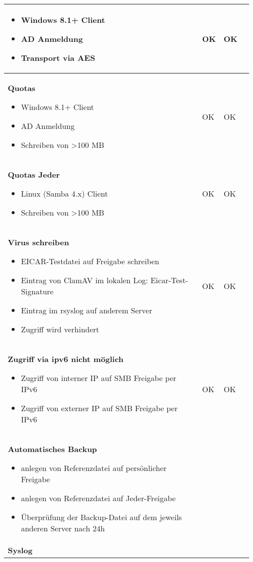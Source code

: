 \begin{longtable}{p{6.8cm}p{2.4cm}p{2.4cm}p{3cm}}
\begin{itemize}
\item
  Windows 8.1+ Client
\item
  AD Anmeldung
\item
  Transport via AES
\end{itemize} & OK & OK & \\
\midrule
\textbf{Quotas}

\begin{itemize}
\item
  Windows 8.1+ Client
\item
  AD Anmeldung
\item
  Schreiben von \textgreater{}100 MB
\end{itemize} & OK & OK & \\
\midrule
\textbf{Quotas Jeder }

\begin{itemize}
\item
  Linux (Samba 4.x) Client
\item
  Schreiben von \textgreater{}100 MB
\end{itemize} & OK & OK & \\
\midrule
\textbf{Virus schreiben}

\begin{itemize}
\item
  EICAR-Testdatei auf Freigabe schreiben
\item 
  Eintrag von ClamAV im lokalen Log: Eicar-Test-Signature
\item 
  Eintrag im rsyslog auf anderem Server
\item
  Zugriff wird verhindert
\end{itemize} & OK & OK & \\
\midrule
\textbf{Zugriff via ipv6 nicht möglich}

\begin{itemize}
\item
  Zugriff von interner IP auf SMB Freigabe per IPv6
\item
  Zugriff von externer IP auf SMB Freigabe per IPv6
\end{itemize} & OK & OK & \\
\midrule
\textbf{Automatisches Backup}

\begin{itemize}
\item
  anlegen von Referenzdatei auf persönlicher Freigabe
\item
  anlegen von Referenzdatei auf Jeder-Freigabe
\item
  Überprüfung der Backup-Datei auf dem jeweils anderen Server nach 24h
\end{itemize} & & & \\
\midrule
\textbf{Syslog}


\end{longtable}
